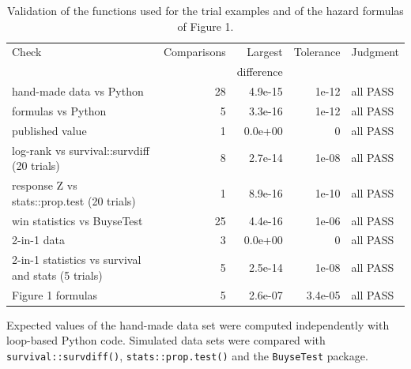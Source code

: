 \begin{table}[htbp]
\centering
\caption{Validation of the functions used for the trial examples and of the hazard formulas of Figure 1.}
\label{tab:functions}
\begin{threeparttable}
\scriptsize\setlength{\tabcolsep}{3pt}
\begin{tabular}{p{5.6cm}rrrl}
\toprule
Check & Comparisons & Largest & Tolerance & Judgment \\
 & & difference & & \\
\midrule
hand-made data vs Python & 28 & 4.9e-15 & 1e-12 & all PASS \\
formulas vs Python & 5 & 3.3e-16 & 1e-12 & all PASS \\
published value & 1 & 0.0e+00 &   0 & all PASS \\
log-rank vs survival::survdiff (20 trials) & 8 & 2.7e-14 & 1e-08 & all PASS \\
response Z vs stats::prop.test (20 trials) & 1 & 8.9e-16 & 1e-10 & all PASS \\
win statistics vs BuyseTest & 25 & 4.4e-16 & 1e-06 & all PASS \\
2-in-1 data & 3 & 0.0e+00 &   0 & all PASS \\
2-in-1 statistics vs survival and stats (5 trials) & 5 & 2.5e-14 & 1e-08 & all PASS \\
Figure 1 formulas & 5 & 2.6e-07 & 3.4e-05 & all PASS \\
\bottomrule
\end{tabular}
\begin{tablenotes}
\footnotesize
\item Expected values of the hand-made data set were computed independently with loop-based Python code. Simulated data sets were compared with \texttt{survival::survdiff()}, \texttt{stats::prop.test()} and the \texttt{BuyseTest} package.
\end{tablenotes}
\end{threeparttable}
\end{table}
